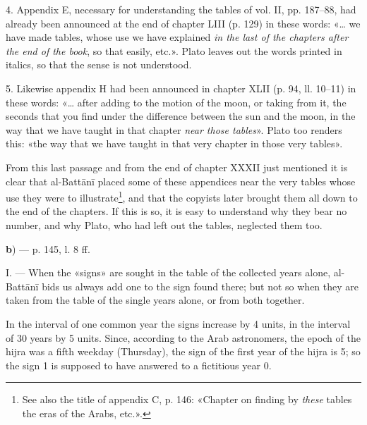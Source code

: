 \documentclass[11pt]{article}
\newcommand{\Pg}[1]{\marginpar{\footnotesize\color{gray}#1}}
\begin{document}
\par 4. Appendix E, necessary for understanding the tables of vol. II, pp. 187–88, had already been announced at the end of chapter LIII (p. 129) in these words: «… we have made tables, whose use we have explained \emph{in the last of the chapters after the end of the book}, so that easily, etc.». Plato leaves out the words printed in italics, so that the sense is not understood.\par
\par 5. Likewise appendix H had been announced in chapter XLII (p. 94, ll. 10–11) in these words: «… after adding to the motion of the moon, or taking from it, the seconds that you find under the difference between the sun and the moon, in the way that we have taught in that chapter \emph{near those tables}». Plato too renders this: «the way that we have taught in that very chapter in those very tables».\par
\par From this last passage and from the end of chapter XXXII just mentioned it is clear that al-Battānī placed some of these appendices near the very tables whose use they were to illustrate\footnote{See also the title of appendix C, p. 146: «Chapter on finding by \emph{these} tables the eras of the Arabs, etc.».}, and that the copyists later brought them all down to the end of the chapters. If this is so, it is easy to understand why they bear no number, and why Plato, who had left out the tables, neglected them too.\par
\par\begin{center}\textbf{b}) — p. 145, l. 8 ff.\end{center}
\par I. — When the «signs» are sought in the table of the collected years alone, al-Battānī bids us always add one to the sign found there; but not so when they are taken from the table of the single years alone, or from both together.\par
\par \Pg{I 323}In the interval of one common year the signs increase by 4 units, in the interval of 30 years by 5 units. Since, according to the Arab astronomers, the epoch of the hijra was a fifth weekday (Thursday), the sign of the first year of the hijra is 5; so the sign 1 is supposed to have answered to a fictitious year 0.\par
\end{document}
